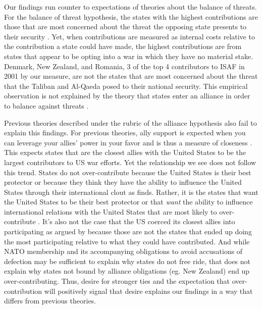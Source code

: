 \documentclass[12pt,letterpaper]{article}
\begin{document}
	Our findings run counter to expectations of theories about the balance of threats. For the balance of threat hypothesis, the states with the highest contributions are those that are most concerned about the threat the opposing state presents to their security \citep{haesebrouck_democraticparticipationair_2016}. Yet, when contributions are measured as internal costs relative to the contribution a state could have made, the highest contributions are from states that appear to be opting into a war in which they have no material stake. Denmark, New Zealand, and Romania, 3 of the top 4 contributors to ISAF in 2001 by our measure, are not the states that are most concerned about the threat that the Taliban and Al-Qaeda posed to their national security. This empirical observation is not explained by the theory that states enter an alliance in order to balance against threats \citep{walt_originsalliance_1987}.

	Previous theories described under the rubric of the alliance hypothesis also fail to explain this findings. For previous theories, ally support is expected when you can leverage your allies' power in your favor and is thus a measure of closeness \citep{davidson_neoclassicalrealistexplanation_2011}. This expects states that are the closest allies with the United States to be the largest contributors to US war efforts. Yet the relationship we see does not follow this trend. States do not over-contribute because the United States is their best protector or because they think they have the ability to influence the United States through their international clout as \citet{ringsmose_natoburdensharingredux_2010} finds. Rather, it is the states that want the United States to be their best protector or that \textit{want} the ability to influence international relations with the United States that are most likely to over-contribute \citep{vonhlatky_greatasymmetryamerica_2010}. It's also not the case that the US coerced its closest allies into participating as argued by \citet{kupchan_natopersiangulf_1988} because those are not the states that ended up doing the most participating relative to what they could have contributed. And while NATO membership and its accompanying obligations to avoid accusations of defection may be sufficient to explain why states do not free ride, that does not explain why states not bound by alliance obligations (eg. New Zealand) end up over-contributing. Thus, desire for stronger ties and the expectation that over-contribution will positively signal that desire explains our findings in a way that differs from previous theories.
\end{document}
